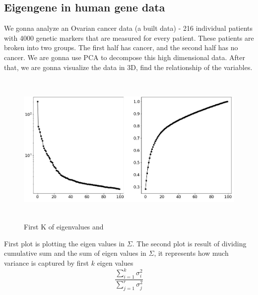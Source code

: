 \documentclass[a4paper, 12pt]{report}
\begin{document}
\subsection{Eigengene in human gene data}
\indent \par We gonna analyze an Ovarian cancer data (a built data) - 216 individual patients with 4000 genetic markers that are measured for every patient. These patients are broken into two groups. The first half has cancer, and the second half has no cancer. We are gonna use PCA to decompose this high dimensional data. After that, we are gonna visualize the data in 3D, find the relationship of the variables.
\begin{figure}[H]
    \center
    \includegraphics[width=15cm,height=7.5cm]{pca2-2.jpg}
    \caption{First K of eigenvalues and}
\end{figure}
\indent \par First plot is plotting the eigen values in $\Sigma$. The second plot is result of dividing cumulative sum and the sum of eigen values in $\Sigma$, it represents how much variance is captured by first $k$ eigen values $${\frac{\sum_{i=1}^k \sigma_i^2}{\sum_{j = 1}^r \sigma_j^2}}$$
\end{document}

